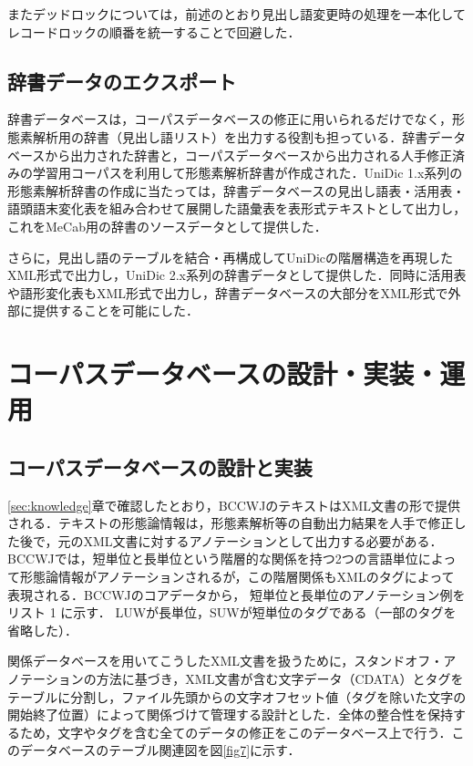 \documentclass[japanese]{jnlp_1.4}
\begin{document}
またデッドロックについては，前述のとおり見出し語変更時の処理を一本化してレコードロックの順番を統一することで回避した．


\subsection{辞書データのエクスポート}

辞書データベースは，コーパスデータベースの修正に用いられるだけでなく，形態素解析用の辞書（見出し語リスト）を出力する役割も担っている．辞書データベースから出力された辞書と，コーパスデータベースから出力される人手修正済みの学習用コーパスを利用して形態素解析辞書が作成された．UniDic 1.x系列の形態素解析辞書の作成に当たっては，辞書データベースの見出し語表・活用表・語頭語末変化表を組み合わせて展開した語彙表を表形式テキストとして出力し，これをMeCab用の辞書のソースデータとして提供した．

さらに，見出し語のテーブルを結合・再構成してUniDicの階層構造を再現したXML形式で出力し，UniDic 2.x系列の辞書データとして提供した．同時に活用表や語形変化表もXML形式で出力し，辞書データベースの大部分をXML形式で外部に提供することを可能にした．


\section{コーパスデータベースの設計・実装・運用}
\label{sec:corpusdb}

\subsection{コーパスデータベースの設計と実装}

\ref{sec:knowledge}章で確認したとおり，BCCWJのテキストはXML文書の形で提供される．テキストの形態論情報は，形態素解析等の自動出力結果を人手で修正した後で，元のXML文書に対するアノテーションとして出力する必要がある．BCCWJでは，短単位と長単位という階層的な関係を持つ2つの言語単位によって形態論情報がアノテーションされるが，この階層関係もXMLのタグによって表現される．BCCWJのコアデータから，
    短単位と長単位のアノテーション例をリスト 1 に示す．
LUWが長単位，SUWが短単位のタグである（一部のタグを省略した）．

関係データベースを用いてこうしたXML文書を扱うために，スタンドオフ・アノテーションの方法に基づき，XML文書が含む文字データ（CDATA）とタグをテーブルに分割し，ファイル先頭からの文字オフセット値（タグを除いた文字の開始終了位置）によって関係づけて管理する設計とした．全体の整合性を保持するため，文字やタグを含む全てのデータの修正をこのデータベース上で行う．このデータベースのテーブル関連図を図\ref{fig7}に示す．
\end{document}
